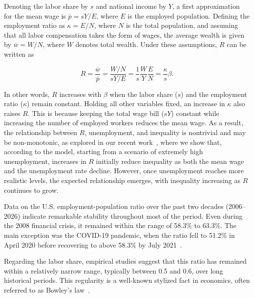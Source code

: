 \documentclass[12pt]{article}
\begin{document}
Denoting the labor share by $s$ and national income by $Y$, a first approximation for the mean wage is $\overline{p}=sY/E$, where $E$ is the employed population. Defining the employment ratio as $\kappa=E/N$, where $N$ is the total population, and assuming that all labor compensation takes the form of wages, the average wealth is given by $\overline{w}=W/N$, where $W$ denotes total wealth. Under these assumptions, $R$ can be written as

\begin{equation}
   R = \frac{\overline{w}}{\overline{p}} = \frac{W/N}{s Y/E}=\frac{1}{s}\frac{W}{Y} \frac{E}{N}=\frac{\kappa}{s}\beta. 
\end{equation}
 
In other words, $R$ increases with $\beta$ when the labor share ($s$) and the employment ratio ($\kappa$) remain constant. Holding all other variables fixed, an increase in $\kappa$ also raises $R$. This is because keeping the total wage bill ($sY$) constant while increasing the number of employed workers reduces the mean wage. As a result, the relationship between $R$, unemployment, and inequality is nontrivial and may be non-monotonic, as explored in our recent work~\cite{Borba2026}, 
where we show that, according to the model, starting from a scenario of extremely high unemployment, increases in $R$ initially reduce inequality as both the mean wage and the unemployment rate decline. However, once unemployment reaches more realistic levels, the expected relationship emerges, with inequality increasing as $R$ continues to grow.

Data on the U.S. employment-population ratio over the past two decades (2006--2026) indicate remarkable stability throughout most of the period. Even during the 2008 financial crisis, it remained within the range of 58.3\% to 63.3\%. The main exception was the COVID-19 pandemic, when the ratio fell to 51.2\% in April 2020 before recovering to above 58.3\% by July 2021~\cite{taxa}.

Regarding the labor share, empirical studies suggest that this ratio has remained within a relatively narrow range, typically between 0.5 and 0.6, over long historical periods. This regularity is a well-known stylized fact in economics, often referred to as Bowley's law~\cite{farjoun2022labor}.
\end{document}

